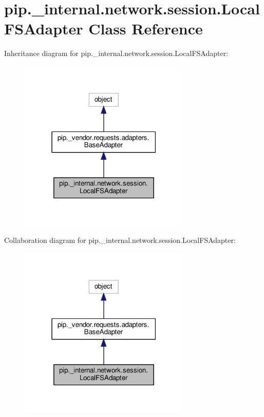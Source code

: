 \hypertarget{classpip_1_1__internal_1_1network_1_1session_1_1LocalFSAdapter}{}\section{pip.\+\_\+internal.\+network.\+session.\+Local\+F\+S\+Adapter Class Reference}
\label{classpip_1_1__internal_1_1network_1_1session_1_1LocalFSAdapter}


Inheritance diagram for pip.\+\_\+internal.\+network.\+session.\+Local\+F\+S\+Adapter\+:
\nopagebreak
\begin{figure}[H]
\begin{center}
\leavevmode
\includegraphics[width=231pt]{classpip_1_1__internal_1_1network_1_1session_1_1LocalFSAdapter__inherit__graph}
\end{center}
\end{figure}


Collaboration diagram for pip.\+\_\+internal.\+network.\+session.\+Local\+F\+S\+Adapter\+:
\nopagebreak
\begin{figure}[H]
\begin{center}
\leavevmode
\includegraphics[width=231pt]{classpip_1_1__internal_1_1network_1_1session_1_1LocalFSAdapter__coll__graph}
\end{center}
\end{figure}
